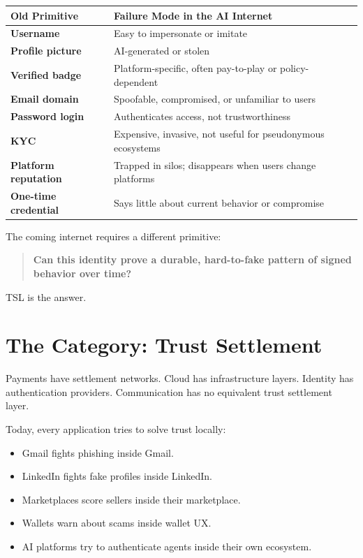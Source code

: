 \documentclass[11pt]{article}
\newcommand{\TSL}{\textsc{TSL}}
\begin{document}
\begin{center}
\begin{tabularx}{\textwidth}{>{\bfseries}p{} X}
\toprule
Old Primitive & Failure Mode in the AI Internet \\
\midrule
Username & Easy to impersonate or imitate \\
Profile picture & AI-generated or stolen \\
Verified badge & Platform-specific, often pay-to-play or policy-dependent \\
Email domain & Spoofable, compromised, or unfamiliar to users \\
Password login & Authenticates access, not trustworthiness \\
KYC & Expensive, invasive, not useful for pseudonymous ecosystems \\
Platform reputation & Trapped in silos; disappears when users change platforms \\
One-time credential & Says little about current behavior or compromise \\
\bottomrule
\end{tabularx}
\end{center}

The coming internet requires a different primitive:

\begin{quote}
\textbf{Can this identity prove a durable, hard-to-fake pattern of signed behavior over time?}
\end{quote}

\TSL{} is the answer.

\section{The Category: Trust Settlement}

Payments have settlement networks. Cloud has infrastructure layers. Identity has authentication providers. Communication has no equivalent trust settlement layer.

Today, every application tries to solve trust locally:

\begin{itemize}
    \item Gmail fights phishing inside Gmail.
    \item LinkedIn fights fake profiles inside LinkedIn.
    \item Marketplaces score sellers inside their marketplace.
    \item Wallets warn about scams inside wallet UX.
    \item AI platforms try to authenticate agents inside their own ecosystem.
\end{itemize}
\end{document}
